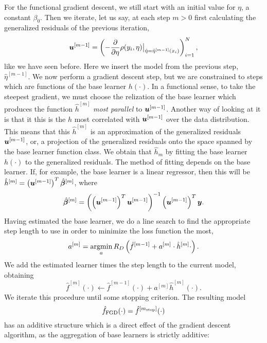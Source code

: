 For the functional gradient descent, we still start with an initial value for $\eta$, a constant $\beta_0$.
Then we iterate, let us say, at each step $m>0$ first calculating the generalized residuals of the previous iteration,
\begin{equation*}
    \bm{u}^{[m-1]}=\left(-\frac{\partial}{\partial \eta}\rho(y_i, \eta)\big\rvert_{\hat{\eta}=\hat{\eta}^{[m-1]}(x_i)}\right)_{i=1}^N,
\end{equation*}
like we have seen before. Here we insert the model from the previous step, $\hat{\eta}^{[m-1]}$.
We now perform a gradient descent step, but we are constrained to steps which are functions of the base learner $h(\cdot)$.
In a functional sense, to take the steepest gradient, we must choose the relization of the base learner which produces the function $\hat{h}^{[m]}$ \textit{most parallel} to $\bm{u}^{[m-1]}$.
Another way of looking at it is that it this is the $h$ most  correlated with $\bm{u}^{[m-1]}$ over the data distribution.
This means that this $\hat{h}^{[m]}$ is an approximation of the generalized residuals $\bm{u}^{[m-1]}$, or, a projection of the generalized residuals onto the space spanned by the base learner function class.
We obtain that $\hat{h}_m$ by fitting the base learner $h(\cdot)$ to the generalized residuals.
The method of fitting depends on the base learner.
If, for example, the base learner is a linear regressor, then this will be $\hat{h}^{[m]}=\left(\bm{u}^{[m-1]}\right)^T\hat{\boldsymbol{\beta}}^{[m]}$, where
\begin{equation*}
    \hat{\boldsymbol{\beta}}^{[m]}=\left(\left(\bm{u}^{[m-1]}\right)^T\bm{u}^{[m-1]}\right)^{-1}\left(\bm{u}^{[m-1]}\right)^T\bm{y}.
\end{equation*}
Having estimated the base learner, we do a line search to find the appropriate step length to use in order to minimize the loss function the most,
\begin{equation*}
    a^{[m]}=\operatorname*{argmin}_{a}R_D\left(\hat{f}^{[m-1]}+a^{[m]}\cdot\hat{h}^{[m]}{\cdot}\right).
\end{equation*}
We add the estimated learner times the step length to the current model, obtaining
\begin{equation*}
    \hat{f}^{[m]}(\cdot)\gets \hat{f}^{[m-1]}(\cdot)+a^{[m]}\hat{h}^{[m]}(\cdot).
\end{equation*}
We iterate this procedure until some stopping criterion. The resulting model
\begin{equation*}
    \hat{f}_{\text{FGD}}(\cdot)=\hat{f}^{[m_{\text{stop}}]}(\cdot)
\end{equation*}
has an additive structure which is a direct effect of the gradient descent algorithm, as the aggregation of base learners is strictly additive:
